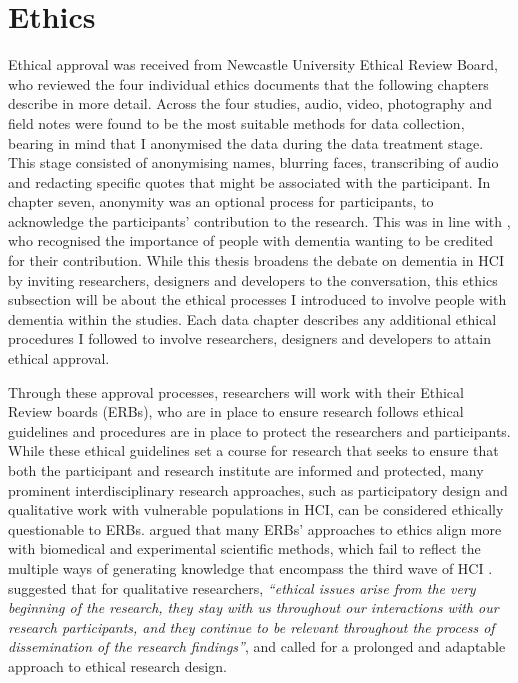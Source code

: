 \section{Ethics}
\label{Method:Ethics}
Ethical approval was received from Newcastle University Ethical Review Board, who reviewed the four individual ethics documents that the following chapters describe in more detail. Across the four studies, audio, video, photography and field notes were found to be the most suitable methods for data collection, bearing in mind that I anonymised the data during the data treatment stage. This stage consisted of anonymising names, blurring faces, transcribing of audio and redacting specific quotes that might be associated with the participant. In chapter seven, anonymity was an optional process for participants, to acknowledge the participants' contribution to the research. This was in line with \cite{hendriks_valuing_2018}, who recognised the importance of people with dementia wanting to be credited for their contribution. While this thesis broadens the debate on dementia in HCI by inviting researchers, designers and developers to the conversation, this ethics subsection will be about the ethical processes I introduced to involve people with dementia within the studies. Each data chapter describes any additional ethical procedures I followed to involve researchers, designers and developers to attain ethical approval.

Through these approval processes, researchers will work with their Ethical Review boards (ERBs), who are in place to ensure research follows ethical guidelines and procedures are in place to protect the researchers and participants. While these ethical guidelines set a course for research that seeks to ensure that both the participant and research institute are informed and protected, many prominent interdisciplinary research approaches, such as participatory design and qualitative work with vulnerable populations in HCI, can be considered ethically questionable to ERBs. \cite{bell_censorship_2014} argued that many ERBs’ approaches to ethics align more with biomedical and experimental scientific methods, which fail to reflect the multiple ways of generating knowledge that encompass the third wave of HCI \citep{bodker_when_2006,lazar_critical_2017}. \cite{carla_introducing_2013} suggested that for qualitative researchers,\textit{ ``ethical issues arise from the very beginning of the research, they stay with us throughout our interactions with our research participants, and they continue to be relevant throughout the process of dissemination of the research findings''}, and called for a prolonged and adaptable approach to ethical research design. 

